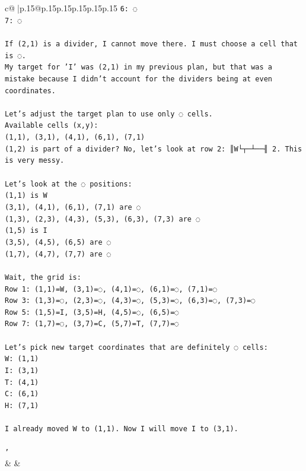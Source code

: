\documentclass{article}
\begin{document}
{\begin{supertabular}{c@{$\;$}|p{.15\linewidth}@{}p{.15\linewidth}p{.15\linewidth}p{.15\linewidth}p{.15\linewidth}p{.15\linewidth}}
{{{\texttt{6: ◌} \\
\texttt{7: ◌} \\
\\ 
\texttt{If (2,1) is a divider, I cannot move there. I must choose a cell that is ◌.} \\
\texttt{My target for 'I' was (2,1) in my previous plan, but that was a mistake because I didn't account for the dividers being at even coordinates.} \\
\\ 
\texttt{Let's adjust the target plan to use only ◌ cells.} \\
\texttt{Available cells (x,y):} \\
\texttt{(1,1), (3,1), (4,1), (6,1), (7,1)} \\
\texttt{(1,2) is part of a divider? No, let's look at row 2: ║W└┬─┴──╢ 2. This is very messy.} \\
\\ 
\texttt{Let's look at the ◌ positions:} \\
\texttt{(1,1) is W} \\
\texttt{(3,1), (4,1), (6,1), (7,1) are ◌} \\
\texttt{(1,3), (2,3), (4,3), (5,3), (6,3), (7,3) are ◌} \\
\texttt{(1,5) is I} \\
\texttt{(3,5), (4,5), (6,5) are ◌} \\
\texttt{(1,7), (4,7), (7,7) are ◌} \\
\\ 
\texttt{Wait, the grid is:} \\
\texttt{Row 1: (1,1)=W, (3,1)=◌, (4,1)=◌, (6,1)=◌, (7,1)=◌} \\
\texttt{Row 3: (1,3)=◌, (2,3)=◌, (4,3)=◌, (5,3)=◌, (6,3)=◌, (7,3)=◌} \\
\texttt{Row 5: (1,5)=I, (3,5)=H, (4,5)=◌, (6,5)=◌} \\
\texttt{Row 7: (1,7)=◌, (3,7)=C, (5,7)=T, (7,7)=◌} \\
\\ 
\texttt{Let's pick new target coordinates that are definitely ◌ cells:} \\
\texttt{W: (1,1)} \\
\texttt{I: (3,1)} \\
\texttt{T: (4,1)} \\
\texttt{C: (6,1)} \\
\texttt{H: (7,1)} \\
\\ 
\texttt{I already moved W to (1,1). Now I will move I to (3,1).} \\
\\ 
\texttt{'} \\
            }
        }
    }
    & & \\ \\


\end{supertabular}}
\end{document}
